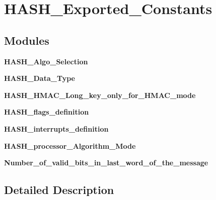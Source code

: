\section{H\+A\+S\+H\+\_\+\+Exported\+\_\+\+Constants}
\label{group__HASH__Exported__Constants}
\subsection*{Modules}
\begin{DoxyCompactItemize}
\item 
\textbf{ H\+A\+S\+H\+\_\+\+Algo\+\_\+\+Selection}
\item 
\textbf{ H\+A\+S\+H\+\_\+\+Data\+\_\+\+Type}
\item 
\textbf{ H\+A\+S\+H\+\_\+\+H\+M\+A\+C\+\_\+\+Long\+\_\+key\+\_\+only\+\_\+for\+\_\+\+H\+M\+A\+C\+\_\+mode}
\item 
\textbf{ H\+A\+S\+H\+\_\+flags\+\_\+definition}
\item 
\textbf{ H\+A\+S\+H\+\_\+interrupts\+\_\+definition}
\item 
\textbf{ H\+A\+S\+H\+\_\+processor\+\_\+\+Algorithm\+\_\+\+Mode}
\item 
\textbf{ Number\+\_\+of\+\_\+valid\+\_\+bits\+\_\+in\+\_\+last\+\_\+word\+\_\+of\+\_\+the\+\_\+message}
\end{DoxyCompactItemize}


\subsection{Detailed Description}
